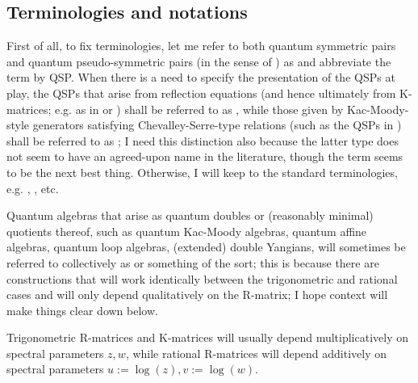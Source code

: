         \subsection{Terminologies and notations}
            \begin{convention}
                First of all, to fix terminologies, let me refer to both quantum symmetric pairs and quantum pseudo-symmetric pairs (in the sense of \cite{regelskis_vlaar_kac_moody_pseudo_symmetric_pairs}) as  and abbreviate the term by QSP. When there is a need to specify the presentation of the QSPs at play, the QSPs that arise from reflection equations (and hence ultimately from K-matrices; e.g. as in \cite{molev_ragoucy_sorba_twisted_q_yangians_type_A} or \cite{guay_regelskis_twisted_yangians_for_symmetric_pairs_of_types_BCD}) shall be referred to as , while those given by Kac-Moody-style generators satisfying Chevalley-Serre-type relations (such as the QSPs in \cite{regelskis_vlaar_reflection_matrices_coideal_subalgebras}) shall be referred to as ; I need this distinction also because the latter type does not seem to have an agreed-upon name in the literature, though the term  seems to be the next best thing. Otherwise, I will keep to the standard terminologies, e.g. , , etc.
            
                Quantum algebras that arise as quantum doubles or (reasonably minimal) quotients thereof, such as quantum Kac-Moody algebras, quantum affine algebras, quantum loop algebras, (extended) double Yangians, will sometimes be referred to collectively as  or something of the sort; this is because there are constructions that will work identically between the trigonometric and rational cases and will only depend qualitatively on the R-matrix; I hope context will make things clear down below.
            \end{convention}

            \begin{convention}
                Trigonometric R-matrices and K-matrices will usually depend multiplicatively on spectral parameters $z, w$, while rational R-matrices will depend additively on spectral parameters $u := \log(z), v := \log(w)$.
            \end{convention}

